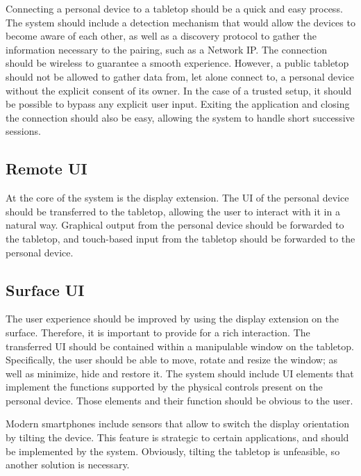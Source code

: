 
Connecting a personal device to a tabletop should be a quick and easy process.
The system should include a detection mechanism that would allow the devices to become aware of each other, as well as a discovery protocol to gather the information necessary to the pairing, such as a Network IP.
The connection should be wireless to guarantee a smooth experience.
However, a public tabletop should not be allowed to gather data from, let alone connect to, a personal device without the explicit consent of its owner.
In the case of a trusted setup, it should be possible to bypass any explicit user input.
Exiting the application and closing the connection should also be easy, allowing the system to handle short successive sessions.

\subsection{Remote UI}

At the core of the system is the display extension.
The UI of the personal device should be transferred to the tabletop, allowing the user to interact with it in a natural way.
Graphical output from the personal device should be forwarded to the tabletop, and touch-based input from the tabletop should be forwarded to the personal device.

\subsection{Surface UI}

The user experience should be improved by using the display extension on the surface.
Therefore, it is important to provide for a rich interaction.
The transferred UI should be contained within a manipulable window on the tabletop.
Specifically, the user should be able to move, rotate and resize the window; as well as minimize, hide and restore it.
The system should include UI elements that implement the functions supported by the physical controls present on the personal device.
Those elements and their function should be obvious to the user.

Modern smartphones include sensors that allow to switch the display orientation by tilting the device.
This feature is strategic to certain applications, and should be implemented by the system.
Obviously, tilting the tabletop is unfeasible, so another solution is necessary.

